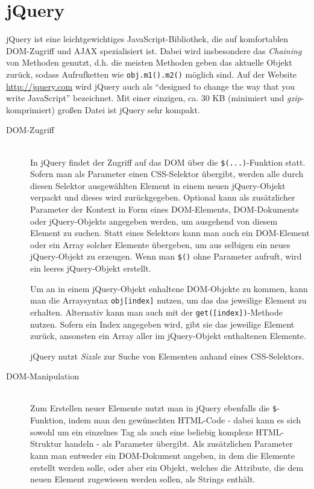 \section{jQuery}
jQuery ist eine leichtgewichtiges JavaScript-Bibliothek, die auf komfortablen DOM-Zugriff und AJAX
spezialisiert ist. Dabei wird insbesondere das \emph{Chaining} von Methoden genutzt, d.h. die
meisten Methoden geben das aktuelle Objekt zurück, sodass Aufrufketten wie \lstinline{obj.m1().m2()}
möglich sind. Auf der Website \href{http://jquery.com}{http://jquery.com} wird jQuery auch als
\enquote{designed to change the way that you write JavaScript} bezeichnet. Mit einer einzigen, ca.
30 KB (minimiert und \emph{gzip}-komprimiert) großen Datei ist jQuery sehr kompakt.

\begin{description}
\item[DOM-Zugriff] \hfill \\
In jQuery findet der Zugriff auf das DOM über die \lstinline{$(...)}-Funktion statt. Sofern man als
Parameter einen CSS-Selektor übergibt, werden alle durch diesen Selektor ausgewählten Element in
einem neuen jQuery-Objekt verpackt und dieses wird zurückgegeben. Optional kann als zusätzlicher
Parameter der Kontext in Form eines DOM-Elements, DOM-Dokuments oder jQuery-Objekts angegeben
werden, um ausgehend von diesem Element zu suchen. Statt eines Selektors kann man auch ein
DOM-Element oder ein Array solcher Elemente übergeben, um aus selbigen ein neues jQuery-Objekt zu
erzeugen. Wenn man \lstinline{$()} ohne Parameter aufruft, wird ein leeres jQuery-Objekt erstellt.

Um an in einem jQuery-Objekt enhaltene DOM-Objekte zu kommen, kann man die Arraysyntax
\lstinline{obj[index]} nutzen, um das das jeweilige Element zu erhalten. Alternativ kann man auch
mit der \lstinline{get([index])}-Methode nutzen. Sofern ein Index angegeben wird, gibt sie das
jeweilige Element zurück, ansonsten ein Array aller im jQuery-Objekt enthaltenen Elemente.

jQuery nutzt \emph{Sizzle} zur Suche von Elementen anhand eines CSS-Selektors.

\item[DOM-Manipulation] \hfill \\
Zum Erstellen neuer Elemente nutzt man in jQuery ebenfalls die \lstinline{$}-Funktion, indem man den
gewünschten HTML-Code - dabei kann es sich sowohl um ein einzelnes Tag als auch eine beliebig
komplexe HTML-Struktur handeln - als Parameter übergibt. Als zusätzlichen Parameter kann man
entweder ein DOM-Dokument angeben, in dem die Elemente erstellt werden solle, oder aber ein Objekt,
welches die Attribute, die dem neuen Element zugewiesen werden sollen, als Strings enthält.


\end{description}
